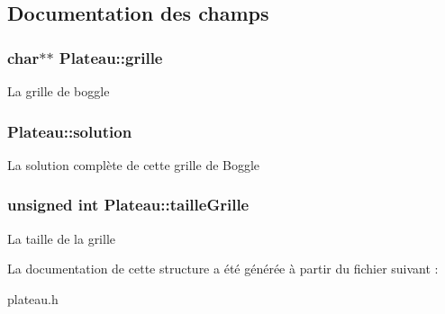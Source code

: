\subsection{Documentation des champs}
\hypertarget{structPlateau_a42411aa44b78d298681030ce3461f686}{
\subsubsection[{grille}]{\setlength{\rightskip}{0pt plus 5cm}char$\ast$$\ast$ {\bf Plateau::grille}}}
\label{structPlateau_a42411aa44b78d298681030ce3461f686}
La grille de boggle \hypertarget{structPlateau_aed88af50891b17edcd3ba97d7098dfde}{
\subsubsection[{solution}]{ {\bf Plateau::solution}}}
\label{structPlateau_aed88af50891b17edcd3ba97d7098dfde}
La solution complète de cette grille de Boggle \hypertarget{structPlateau_aa71d603afaf91ff7c81427af61919a34}{
\subsubsection[{tailleGrille}]{\setlength{\rightskip}{0pt plus 5cm}unsigned int {\bf Plateau::tailleGrille}}}
\label{structPlateau_aa71d603afaf91ff7c81427af61919a34}
La taille de la grille 

La documentation de cette structure a été générée à partir du fichier suivant :\begin{DoxyCompactItemize}
\item 
plateau.h\end{DoxyCompactItemize}
